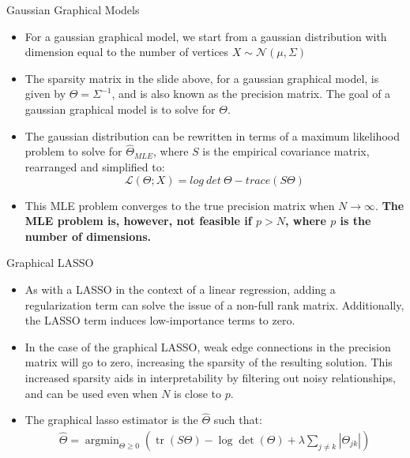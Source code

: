 \documentclass{beamer}
\begin{document}
\begin{frame}{Gaussian Graphical Models}
  \begin{itemize}
    \item For a gaussian graphical model, we start from a gaussian distribution with dimension equal to the number of vertices $X \sim \mathcal{N}(\mu, \Sigma)$
    \item The sparsity matrix in the slide above, for a gaussian graphical model, is given by $\Theta = \Sigma^{-1}$, and is also known as the precision matrix. The goal of a gaussian graphical model is to solve for $\Theta$.
    \item The gaussian distribution can be rewritten in terms of a maximum likelihood problem to solve for $\hat{\Theta}_{MLE}$, where $S$ is the empirical covariance matrix, rearranged and simplified to:
    \[\mathcal{L}(\Theta; X) = log \ det \ \Theta - trace(S \Theta)\]
    \item This MLE problem converges to the true precision matrix when $N \xrightarrow{} \infty$.
    \textbf{The MLE problem is, however, not feasible if $p > N$, where $p$ is the number of dimensions.}
  \end{itemize}
\end{frame}

\begin{frame}{Graphical LASSO}
  \begin{itemize}
    \item As with a LASSO in the context of a linear regression, adding a regularization term can solve the issue of a non-full rank matrix.
    Additionally, the LASSO term induces low-importance terms to zero.
    \item In the case of the graphical LASSO, weak edge connections in the precision matrix will go to zero, increasing the sparsity of the resulting solution.
    This increased sparsity aids in interpretability by filtering out noisy relationships, and can be used even when $N$ is close to $p$.
    \item The graphical lasso estimator is the $\hat{\Theta}$ such that:
\begin{align*}
    \hat{\Theta}=\operatorname{argmin}_{\Theta \geq 0}\left(\operatorname{tr}(S \Theta)-\log \operatorname{det}(\Theta)+\lambda \sum_{j \neq k}\left|\Theta_{j k}\right|\right)
\end{align*}
  \end{itemize}
\end{frame}
\end{document}
